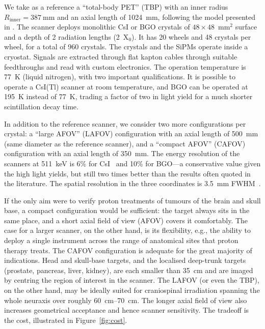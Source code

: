 \documentclass[11pt]{article}
\begin{document}
We take as a reference a ``total-body PET'' (TBP) with an
inner radius $R_{\mathrm{inner}} = \SI{387}{\milli\metre}$ and an axial length of
\SI{1024}{\milli\metre}, following the model presented in \cite{soleti_crysp}. The scanner deploys monolithic CsI or BGO crystals of $48 \times 48$~mm$^2$ surface and a depth of 2 radiation lengths
(2~X$_0$). It has 20 wheels and 48 crystals
per wheel, for a total of 960 crystals. The crystals and the SiPMs operate inside a cryostat. Signals are extracted through flat kapton cables through suitable feedthroughs and read with custom electronics. The operation temperature is  \SI{77}{\kelvin}
 (liquid nitrogen), with two important qualifications. It is possible to operate a CsI(Tl) scanner at room temperature, and BGO can be operated at \SI{195}{\kelvin} instead of \SI{77}{\kelvin}, trading a factor of two in light yield for a much shorter scintillation decay time. 
 
 In addition to the reference scanner, we consider two more configurations per crystal: a ``large AFOV'' (LAFOV) configuration with an axial length of \SI{500}{\milli\metre} (same diameter as the reference scanner), and a ``compact AFOV'' (CAFOV) configuration with an axial length of \SI{350}{\milli\metre}. The energy resolution of the scanners at \SI{511}{\kilo\electronvolt} is 6\% for CsI~\cite{soleti_crysp,soleti_csi} and
10\% for BGO---a conservative value given the high light yields, but still two times better than the results often quoted in the literature. The spatial resolution in the three
coordinates is \SI{3.5}{\milli\metre} FWHM~\cite{soleti_crysp}.


If the only aim were to verify proton treatments of tumours of the brain and
skull base, a compact configuration would be sufficient: the
target always sits in the same place, and a short axial field of view (AFOV)
covers it comfortably. The case for a larger scanner, on the other hand,  is its flexibility, e.g., the ability to deploy a single
instrument across the range of anatomical sites that proton therapy treats.
The CAFOV configuration is adequate for the great majority of
indications. Head and skull-base targets, and the localised deep-trunk targets
(prostate, pancreas, liver, kidney), are each smaller than \SI{35}{\centi\metre}
and are imaged by centring the region of interest in the scanner. The LAFOV (or even the TBP), on the other hand,
may be ideally suited for craniospinal irradiation spanning the whole neuraxis over roughly \SIrange{60}{70}{\centi\metre}. The longer axial field of view also increases geometrical acceptance and hence scanner sensitivity. The tradeoff is the cost, illustrated in Figure~\ref{fig:cost}.
\end{document}
